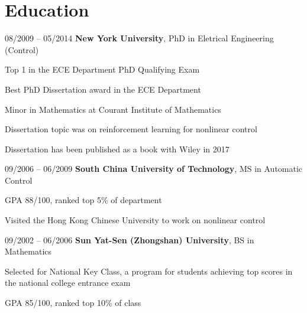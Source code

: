 \section{Education}
\begin{twocolentry}{
08/2009 – 05/2014
}
\textbf{New York University}, PhD in Eletrical Engineering (Control)\end{twocolentry}
\vspace{0.10 cm}
\begin{onecolentry}
\begin{highlights}
\item Top 1 in the ECE Department PhD Qualifying Exam
\item Best PhD Dissertation award in the ECE Department
\item Minor in Mathematics at Courant Institute of Mathematics
\item Dissertation topic was on reinforcement learning for nonlinear control 
\item Dissertation has been
published as a book with Wiley in 2017
\end{highlights}
\end{onecolentry}
\vspace{0.25 cm}
\begin{twocolentry}{
09/2006 – 06/2009
}
\textbf{South China University of Technology}, MS in Automatic Control \end{twocolentry}

\vspace{0.1 cm}
\begin{onecolentry}
\begin{highlights}
\item GPA 88/100, ranked top 5\% of department
\item Visited the Hong Kong Chinese University to work on nonlinear control
\end{highlights}
\end{onecolentry}
\begin{twocolentry}{
09/2002 – 06/2006
}
\vspace{0.25 cm}
\textbf{Sun Yat-Sen (Zhongshan) University}, BS in Mathematics \end{twocolentry}
\vspace{0.1 cm}
\begin{onecolentry}
\begin{highlights}
\item Selected for National Key Class, a program for students achieving top scores in the national college entrance exam
\item GPA 85/100, ranked top 10\% of class %
\end{highlights}
\end{onecolentry}
